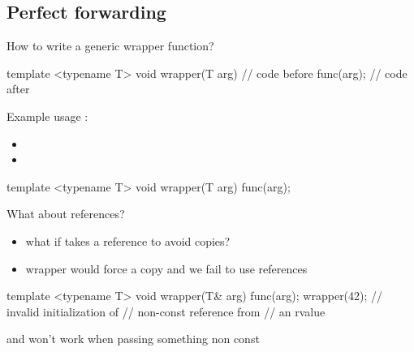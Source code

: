 \subsection[forward]{Perfect forwarding}

\begin{frame}[fragile]
  How to write a generic wrapper function?
  \begin{block}{}
    \begin{cppcode*}{}
      template <typename T>
      void wrapper(T arg) {
        // code before
        func(arg);
        // code after
      }
    \end{cppcode*}
  \end{block}
  Example usage :
  \begin{itemize}
  \item {}
  \item {}
  \end{itemize}
\end{frame}

\begin{frame}[fragile]
  \begin{block}{}
    \begin{cppcode*}{}
      template <typename T>
      void wrapper(T arg) {
        func(arg);
      }
    \end{cppcode*}
  \end{block}
  \begin{alertblock}{What about references?}
    \begin{itemize}
      \item what if  takes a reference to avoid copies?
      \item wrapper would force a copy and we fail to use references
    \end{itemize}

  \end{alertblock}
\end{frame}

\begin{frame}[fragile]
  \begin{block}{}
    \begin{cppcode*}{}
      template <typename T>
      void wrapper(T& arg) {
        func(arg);
      }
      wrapper(42);
      // invalid initialization of
      // non-const reference from
      // an rvalue
    \end{cppcode*}
  \end{block}
  \begin{alertblock}{}
     and  won't work when passing something non const
  \end{alertblock}
\end{frame}

